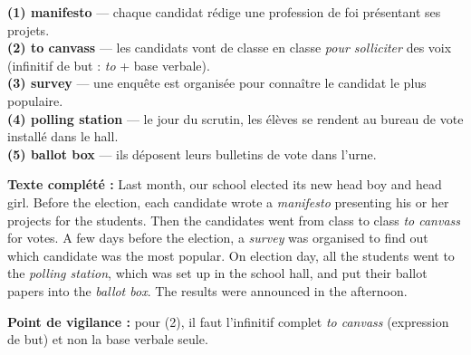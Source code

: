 \documentclass[11pt]{article}
\begin{document}
\begin{corrige}

\textbf{(1) manifesto} — chaque candidat rédige une profession de foi présentant ses projets.\\
\textbf{(2) to canvass} — les candidats vont de classe en classe \emph{pour solliciter} des voix (infinitif de but : \emph{to} + base verbale).\\
\textbf{(3) survey} — une enquête est organisée pour connaître le candidat le plus populaire.\\
\textbf{(4) polling station} — le jour du scrutin, les élèves se rendent au bureau de vote installé dans le hall.\\
\textbf{(5) ballot box} — ils déposent leurs bulletins de vote dans l'urne.

\textbf{Texte complété :} Last month, our school elected its new head boy and head girl. Before the election, each candidate wrote a \emph{manifesto} presenting his or her projects for the students. Then the candidates went from class to class \emph{to canvass} for votes. A few days before the election, a \emph{survey} was organised to find out which candidate was the most popular. On election day, all the students went to the \emph{polling station}, which was set up in the school hall, and put their ballot papers into the \emph{ballot box}. The results were announced in the afternoon.

\textbf{Point de vigilance :} pour (2), il faut l'infinitif complet \emph{to canvass} (expression de but) et non la base verbale seule.
\end{corrige}
\end{document}
